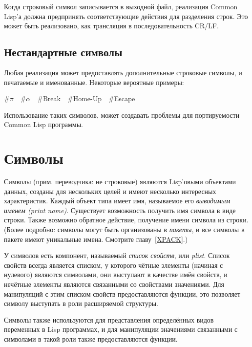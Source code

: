 Когда строковый символ  записывается в выходной файл,
реализация Common Lisp'а должна предпринять соответствующие действия для
разделения строк. Это может быть реализовано, как трансляция
 в последовательность CR/LF.

\subsection{Нестандартные символы}

Любая реализация может предоставлять дополнительные строковые символы, и
печатаемые и именованные. Некоторые вероятные примеры:

\begin{lisp}
\#{\Xbackslash}$\pi$~~\#{\Xbackslash}$\alpha$~~\#{\Xbackslash}Break~~\#{\Xbackslash}Home-Up~~\#{\Xbackslash}Escape
\end{lisp}

Использование таких символов, может создавать проблемы для портируемости Common
Lisp программы.

\section{Символы}

Символы (прим. переводчика: не строковые) являются Lisp'овыми объектами данных,
созданы для нескольких целей и имеют несколько интересных характеристик. Каждый
объект типа  имеет имя, называемое его \emph{выводимым именем (print
  name)}. Существует возможность получить имя символа в виде строки. Также
возможно обратное действие, получение имени символа из строки. (Более подробно:
символы могут быть организованы в \emph{пакеты}, и все символы в пакете имеют
уникальные имена. Смотрите главу~\ref{XPACK}.)

У символов есть компонент, называемый \emph{список свойств}, или \emph{plist}.
Список свойств всегда является списком, у которого чётные элементы (начиная с
нулевого) являются символами, они выступают в качестве имён свойств, и нечётные
элементы являются связанными со свойствами значениями. Для манипуляций с этим
списком свойств предоставляются функции, это позволяет символу выступать в роли расширяемой структуры.

Символы также используются для представления определённых видов переменных в
Lisp программах, и для манипуляции значениями связанными с символами в такой
роли также предоставляются функции.

